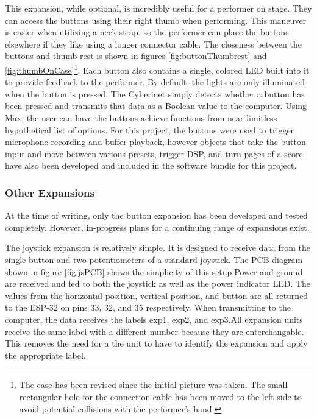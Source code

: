 This expansion, while optional, is incredibly useful for a performer on stage. They can access the buttons using their right thumb when performing. This maneuver is easier when utilizing a neck strap, so the performer can place the buttons elsewhere if they like using a longer connector cable. The closeness between the buttons and thumb rest is shown in figures \ref{fig:buttonThumbrest} and \ref{fig:thumbOnCase}\footnote{The case has been revised since the initial picture was taken. The small rectangular hole for the connection cable has been moved to the left side to avoid potential collisions with the performer's hand.}. Each button also contains a single, colored LED built into it to provide feedback to the performer. By default, the lights are only illuminated when the button is pressed. The Cyberinet simply detects whether a button has been pressed and transmits that data as a Boolean value to the computer. Using Max, the user can have the buttons achieve functions from near limitless hypothetical list of options. For this project, the buttons were used to trigger microphone recording and buffer playback, however objects that take the button input and move between various presets, trigger DSP, and turn pages of a score have also been developed and included in the software bundle for this project.

\subsubsection{Other Expansions}
At the time of writing, only the button expansion has been developed and tested completely. However, in-progress plans for a continuing range of expansions exist.

The joystick expansion is relatively simple. It is designed to receive data from the single button and two potentiometers of a standard joystick. The PCB diagram shown in figure \ref{fig:jsPCB} shows the simplicity of this setup.Power and ground are received and fed to both the joystick as well as the power indicator LED. The values from the horizontal position, vertical position, and button are all returned to the ESP-32 on pins 33, 32, and 35 respectively. When transmitting to the computer, the data receives the labels exp1, exp2, and exp3.All expansion units receive the same label with a different number because they are enterchangable. This removes the need for a the unit to have to identify the expansion and apply the appropriate label.

